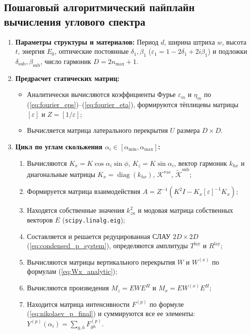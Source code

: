 \documentclass[a4paper,11pt]{article}
\begin{document}
\subsection{Пошаговый алгоритмический пайплайн вычисления углового спектра}

\begin{enumerate}
    \item \textbf{Параметры структуры и материалов:} Период $d$, ширина штриха $w$, высота $t$, энергия $E_0$, оптические постоянные $\delta_1, \beta_1$ ($\varepsilon_1 = 1 - 2\delta_1 + 2i\beta_1$) и подложки $\delta_{\text{sub}}, \beta_{\text{sub}}$, число гармоник $D = 2n_{\max} + 1$.
    \item \textbf{Предрасчет статических матриц:}
    \begin{itemize}
        \item Аналитически вычисляются коэффициенты Фурье $\varepsilon_m$ и $\eta_m$ по (\ref{eq:fourier_eps})--(\ref{eq:fourier_eta}), формируются тёплицевы матрицы $[\varepsilon]$ и $Z = [1/\varepsilon]$;
        \item Вычисляется матрица латерального перекрытия $U$ размера $D \times D$.
    \end{itemize}
    \item \textbf{Цикл по углам скольжения $\alpha_i \in [\alpha_{\min}, \alpha_{\max}]$:}
    \begin{enumerate}
        \item Вычисляются $K_x = K \cos\alpha_i \sin\phi$, $K_z = K \sin\alpha_i$, вектор гармоник $k_{hx}$ и диагональные матрицы $K_x = \operatorname{diag}(k_{hx})$, $\mathcal{K}^{\text{vac}}$, $\tilde{\mathcal{K}}^{\text{sub}}$;
        \item Формируется матрица взаимодействия $A = Z^{-1} (K^2 I - K_x [\varepsilon]^{-1} K_x)$;
        \item Находятся собственные значения $k_{zn}^2$ и модовая матрица собственных векторов $E$ (\texttt{scipy.linalg.eig});
        \item Составляется и решается редуцированная СЛАУ $2D \times 2D$ (\ref{eq:condensed_p_system}), определяются амплитуды $T^{\text{lay}}$ и $R^{\text{lay}}$;
        \item Вычисляются матрицы вертикального перекрытия $W$ и $W^{(x)}$ по формулам (\ref{eq:Wx_analytic});
        \item Вычисляются произведения $M_z = E W E^H$ и $M_x = E W^{(x)} E^H$;
        \item Находится матрица интенсивности $F^{(p)}$ по формуле (\ref{eq:nikolaev_p_final}) и суммируются все ее элементы: $Y^{(p)}(\alpha_i) = \sum_{g, h} F_{gh}^{(p)}$.
    \end{enumerate}
\end{enumerate}
\end{document}
